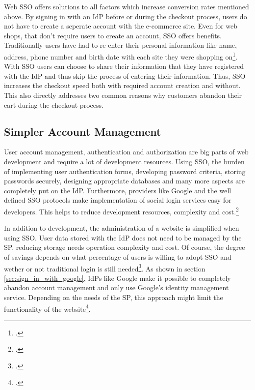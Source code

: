 Web \ac{SSO} offers solutions to all factors which increase conversion rates mentioned above.
By signing in with an \ac{IdP} before or during the checkout process, users do not have to create a seperate
account with the e-commerce site. Even for web shops, that don't require users to create an account, \ac{SSO} offers benefits.
Traditionally users have had to re-enter their personal information like name, address, phone number and birth date
with each site they were shopping on\footcite[Cp. ][p. 24]{Beltran2016}. With \ac{SSO} users can choose to share their information that they have
registered with the \ac{IdP} and thus skip the process of entering their information.
Thus, \ac{SSO} increases the checkout speed both with required account creation and without.
This also directly addresses two common reasons why customers abandon their cart during the checkout process.

\subsection{Simpler Account Management}

User account management, authentication and authorization are big parts of web development and require
a lot of development resources.
Using \ac{SSO}, the burden of implementing user authentication forms, developing password criteria,
storing passwords securely, designing appropriate databases and many more aspects are completely put
on the \ac{IdP}. Furthermore, providers like Google and the well defined \ac{SSO} protocols
make implementation of social login services easy for developers.
This helps to reduce development resources, complexity and cost.\footcite[Cp.][p. 22]{Bazaz2016}

In addition to development, the administration of a website is simplified when using \ac{SSO}.
User data stored with the \ac{IdP} does not need to be managed by the \ac{SP}, reducing storage needs
operation complexity and cost. Of course, the degree of savings depends on what percentage of users is willing
to adopt \ac{SSO} and wether or not traditional login is still needed\footcite[Cp.][p. 22]{Bazaz2016}.
As shown in section \ref{sec:sign_in_with_google}, \acp{IdP} like Google make it possible to completely
abandon account management and only use Google's identity management service.
Depending on the needs of the \ac{SP}, this approach might limit the functionality of the website\footcite[Cp.][p. 22]{Bazaz2016}.

